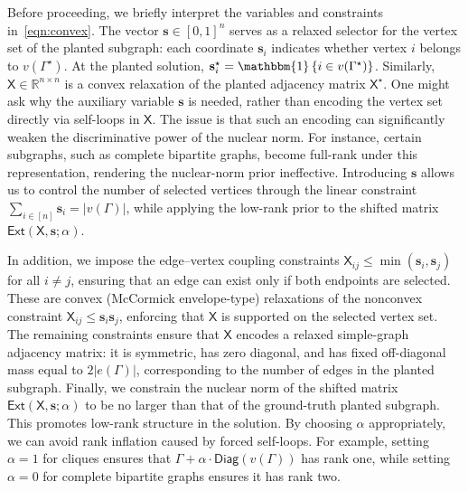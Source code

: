 \documentclass[12pt]{article}
\newcommand{\Ind}{\mathbbm{1}}
\newcommand{\ppp}[1]{\left\{#1\right\}}
\newcommand{\s}[1]{\mathsf{#1}}
\begin{document}
Before proceeding, we briefly interpret the variables and constraints in~\eqref{eqn:convex}. The vector $\mathbf{s}\in[0,1]^n$ serves as a relaxed selector for the vertex set of the planted subgraph: each coordinate $\mathbf{s}_i$ indicates whether vertex $i$ belongs to $v(\Gamma^\star)$. At the planted solution, $\mathbf{s}_i^\star=\Ind\ppp{i\in v(\Gamma^\star)}$. Similarly, $\s{X}\in\mathbb{R}^{n\times n}$ is a convex relaxation of the planted adjacency matrix $\s{X}^\star$. One might ask why the auxiliary variable $\mathbf{s}$ is needed, rather than encoding the vertex set directly via self-loops in $\s{X}$. The issue is that such an encoding can significantly weaken the discriminative power of the nuclear norm. For instance, certain subgraphs, such as complete bipartite graphs, become full-rank under this representation, rendering the nuclear-norm prior ineffective. Introducing $\mathbf{s}$ allows us to control the number of selected vertices through the linear constraint $\sum_{i\in[n]}\mathbf{s}_i = |v(\Gamma)|$, while applying the low-rank prior to the shifted matrix $\s{Ext}(\s{X},\mathbf{s};\alpha)$. 

In addition, we impose the edge--vertex coupling constraints $\s{X}_{ij}\leq\min(\mathbf{s}_i,\mathbf{s}_j)$ for all $i\neq j$, ensuring that an edge can exist only if both endpoints are selected. These are convex (McCormick envelope-type) relaxations of the nonconvex constraint $\s{X}_{ij}\leq \mathbf{s}_i\mathbf{s}_j$, enforcing that $\s{X}$ is supported on the selected vertex set. The remaining constraints ensure that $\s{X}$ encodes a relaxed simple-graph adjacency matrix: it is symmetric, has zero diagonal, and has fixed off-diagonal mass equal to $2|e(\Gamma)|$, corresponding to the number of edges in the planted subgraph. Finally, we constrain the nuclear norm of the shifted matrix $\s{Ext}(\s{X},\mathbf{s};\alpha)$ to be no larger than that of the ground-truth planted subgraph. This promotes low-rank structure in the solution. By choosing $\alpha$ appropriately, we can avoid rank inflation caused by forced self-loops. For example, setting $\alpha=1$ for cliques ensures that $\Gamma+\alpha\cdot\s{Diag}(v(\Gamma))$ has rank one, while setting $\alpha=0$ for complete bipartite graphs ensures it has rank two.
\end{document}
